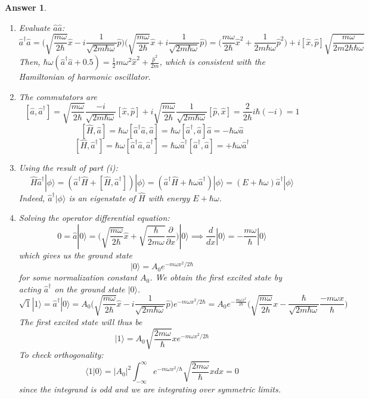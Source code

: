 \documentclass[a4paper]{article}
\newtheorem{ans}{Answer}[subsection]
\theoremstyle{new}
\begin{document}
\begin{ans}\leavevmode
\begin{enumerate}[label=(\roman*)]
\item Evaluate $\hat{a}\hat{a}$:
$$\hat{a}^\dag\hat{a}=\bigg(\sqrt{\frac{m\omega}{2\hbar}}\hat{x}-i\frac{1}{\sqrt{2m\hbar\omega}}\hat{p}\bigg)\bigg(\sqrt{\frac{m\omega}{2\hbar}}\hat{x}+i\frac{1}{\sqrt{2m\hbar\omega}}\hat{p}\bigg)=\bigg(\frac{m\omega}{2\hbar}\hat{x}^2+\frac{1}{2m\hbar\omega}\hat{p}^2\bigg)+i[\hat{x},\hat{p}]\sqrt{\frac{m\omega}{2m2\hbar\hbar\omega}}$$
Then, $\hbar\omega(\hat{a}^\dag\hat{a}+0.5)=\frac{1}{2}m\omega^2\hat{x}^2+\frac{\hat{p}^2}{2m}$, which is consistent with the Hamiltonian of harmonic oscillator.
\item The commutators are
$$[\hat{a},\hat{a}^\dag]=\sqrt{\frac{m\omega}{2\hbar}}\frac{-i}{\sqrt{2m\hbar\omega}}[\hat{x},\hat{p}]+i\sqrt{\frac{m\omega}{2\hbar}}\frac{1}{\sqrt{2m\hbar\omega}}[\hat{p},\hat{x}]=\frac{2}{2\hbar}i\hbar(-i)=1$$
$$[\hat{H},\hat{a}]=\hbar\omega[\hat{a}^\dag\hat{a},\hat{a}]=\hbar\omega[\hat{a}^\dag,\hat{a}]\hat{a}=-\hbar\omega\hat{a}$$
$$[\hat{H},\hat{a}^\dag]=\hbar\omega[\hat{a}^\dag\hat{a},\hat{a}^\dag]=\hbar\omega\hat{a}^\dag[\hat{a}^\dag,\hat{a}]=+\hbar\omega\hat{a}^\dag$$
\item Using the result of part (i):
$$\hat{H}\hat{a}^\dag|\phi\rangle=(\hat{a}^\dag\hat{H}+[\hat{H},\hat{a}^\dag])|\phi\rangle=(\hat{a}^\dag\hat{H}+\hbar\omega\hat{a}^\dag)|\phi\rangle=(E+\hbar\omega)\hat{a}^\dag |\phi\rangle$$
Indeed, $\hat{a}^\dag|\phi\rangle$ is an eigenstate of $\hat{H}$ with energy $E+\hbar\omega$.
\item Solving the operator differential equation:
$$0=\hat{a}|0\rangle=\bigg(\sqrt{\frac{m\omega}{2\hbar}}\hat{x}+\sqrt{\frac{\hbar}{2m\omega}}\frac{\partial}{\partial x}\bigg)|0\rangle\implies\frac{d}{dx}|0\rangle=-\frac{m\omega}{\hbar}|0\rangle$$
which gives us the ground state $$|0\rangle=A_0 e^{-m\omega x^2/2\hbar}$$ for some normalization constant $A_0$. We obtain the first excited state by acting $\hat{a}^\dag$ on the ground state $|0\rangle$.
$$\sqrt{1}|1\rangle=\hat{a}^\dag|0\rangle=A_0\bigg(\sqrt{\frac{m\omega}{2\hbar}}\hat{x}-i\frac{1}{\sqrt{2m\hbar\omega}}\hat{p}\bigg)e^{-m\omega x^2/2\hbar}=A_0e^{-\frac{m\omega x^2}{2\hbar}}\bigg(\sqrt{\frac{m\omega}{2\hbar}}x-\frac{\hbar}{\sqrt{2m\hbar\omega}}\frac{-m\omega x}{\hbar}\bigg)$$
The first excited state will thus be
$$|1\rangle=A_0\sqrt{\frac{2m\omega}{\hbar}}xe^{-m\omega x^2/2\hbar}$$
To check orthogonality:
$$\langle 1|0\rangle=|A_0|^2\int_{-\infty}^\infty e^{-m\omega x^2/\hbar}\sqrt{\frac{2m\omega}{\hbar}}xdx=0$$
since the integrand is odd and we are integrating over symmetric limits.
\end{enumerate}
\end{ans}
\end{document}
